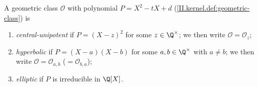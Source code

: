 A geometric class $\mathcal O$ with polynomial $P=X^2-tX+d$ (\cref{II.kernel.def:geometric-class}) is
\begin{enumerate}
  \item[(i)] \emph{central-unipotent} if $P=(X-z)^2$ for some $z\in\Q^\times$; we then write $\mathcal O=\mathcal O_z$;
  \item[(ii)] \emph{hyperbolic} if $P=(X-a)(X-b)$ for some $a,b\in\Q^\times$ with $a\neq b$; we then write $\mathcal O=\mathcal O_{a,b}$ ($=\mathcal O_{b,a}$);
  \item[(iii)] \emph{elliptic} if $P$ is irreducible in $\Q[X]$.
\end{enumerate}
